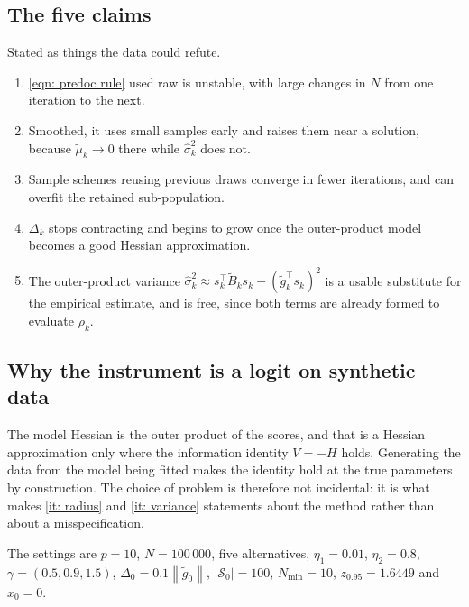 \documentclass[11pt,a4paper]{article}
\providecommand{\norm}[1]{\left \lVert #1 \right \rVert}
\providecommand{\abs}[1]{\left \vert #1 \right \vert}
\begin{document}
\subsection{The five claims}

Stated as things the data could refute.

\begin{enumerate}[label=(C\arabic*), leftmargin=3em]
  \item \label{it: unstable}
    \eqref{eqn: predoc rule} used raw is unstable, with large changes in $N$ from
    one iteration to the next.
  \item \label{it: growth}
    Smoothed, it uses small samples early and raises them near a solution,
    because $\tilde\mu_k \to 0$ there while $\hat\sigma_k^2$ does not.
  \item \label{it: crn}
    Sample schemes reusing previous draws converge in fewer iterations, and can
    overfit the retained sub-population.
  \item \label{it: radius}
    $\Delta_k$ stops contracting and begins to grow once the outer-product model
    becomes a good Hessian approximation.
  \item \label{it: variance}
    The outer-product variance
    $\hat\sigma_k^2 \approx s_k^{\!\top}\tilde B_k s_k - (\tilde g_k^{\!\top}s_k)^2$
    is a usable substitute for the empirical estimate, and is free, since both
    terms are already formed to evaluate $\rho_k$.
\end{enumerate}

\subsection{Why the instrument is a logit on synthetic data}

The model Hessian is the outer product of the scores, and that is a Hessian
approximation only where the information identity $V = -H$ holds. Generating the
data from the model being fitted makes the identity hold at the true parameters
by construction. The choice of problem is therefore not incidental: it is what
makes \ref{it: radius} and \ref{it: variance} statements about the method rather
than about a misspecification.

The settings are $p = 10$, $N = 100\,000$, five alternatives,
$\eta_1 = 0.01$, $\eta_2 = 0.8$, $\gamma = (0.5, 0.9, 1.5)$,
$\Delta_0 = 0.1\norm{\tilde g_0}$, $\abs{\mathcal{S}_0} = 100$,
$N_{\min} = 10$, $z_{0.95} = 1.6449$ and $x_0 = 0$.

\end{document}
